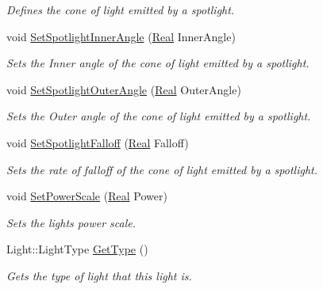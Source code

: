 \begin{DoxyCompactItemize}
\begin{DoxyCompactList}\small\item\em Defines the cone of light emitted by a spotlight. \item\end{DoxyCompactList}\item 
void \hyperlink{classphys_1_1Light_a3b812a0181d08f3c30c9a75f13fd6282}{SetSpotlightInnerAngle} (\hyperlink{namespacephys_af7eb897198d265b8e868f45240230d5f}{Real} InnerAngle)
\begin{DoxyCompactList}\small\item\em Sets the Inner angle of the cone of light emitted by a spotlight. \item\end{DoxyCompactList}\item 
void \hyperlink{classphys_1_1Light_a6cab679dfc15d35e3d3b8b229e602fff}{SetSpotlightOuterAngle} (\hyperlink{namespacephys_af7eb897198d265b8e868f45240230d5f}{Real} OuterAngle)
\begin{DoxyCompactList}\small\item\em Sets the Outer angle of the cone of light emitted by a spotlight. \item\end{DoxyCompactList}\item 
void \hyperlink{classphys_1_1Light_a170e0fc23e3a50587a483fa8981b5486}{SetSpotlightFalloff} (\hyperlink{namespacephys_af7eb897198d265b8e868f45240230d5f}{Real} Falloff)
\begin{DoxyCompactList}\small\item\em Sets the rate of falloff of the cone of light emitted by a spotlight. \item\end{DoxyCompactList}\item 
void \hyperlink{classphys_1_1Light_af4a6428b87c443a33261575783a4fb05}{SetPowerScale} (\hyperlink{namespacephys_af7eb897198d265b8e868f45240230d5f}{Real} Power)
\begin{DoxyCompactList}\small\item\em Sets the lights power scale. \item\end{DoxyCompactList}\item 
Light::LightType \hyperlink{classphys_1_1Light_aede2c9db5c558e649a5de00ff6918ff4}{GetType} ()
\begin{DoxyCompactList}\small\item\em Gets the type of light that this light is. \item\end{DoxyCompactList}\item 

\end{DoxyCompactItemize}
